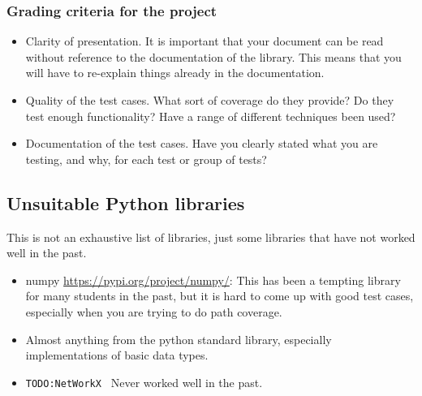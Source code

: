 \documentclass[a4paper]{article}
\newcommand{\todo}[1]{{\tt TODO:#1}}
\begin{document}
\subsubsection*{Grading criteria for the project}
\begin{itemize}
\item Clarity of presentation. It is important that your document can
  be read without reference to the documentation of the library. This
  means that you will have to re-explain things already in the
  documentation. 
\item Quality of the test cases. What sort of coverage do they
  provide? Do they test enough functionality? Have a range of different 
  techniques been used?
\item Documentation of the test cases. Have you clearly stated what you are
  testing, and why, for each test or group of tests? 

 
\end{itemize}

\subsection*{Unsuitable Python libraries}
This is not an exhaustive list of libraries, just some libraries that
have not worked well in the past.
\begin{itemize}
\item numpy \url{https://pypi.org/project/numpy/}: This has been a
  tempting library for many students in the past, but it is hard to
  come up with good test cases, especially when you are trying to do
  path coverage.
\item Almost anything from the python standard library, especially
  implementations of basic data types.
\item \todo{NetWorkX   } Never worked well in the past.
\end{itemize}
\end{document}
